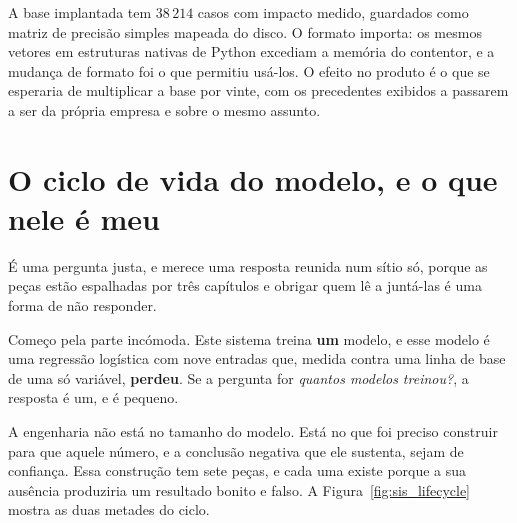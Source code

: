 A base implantada tem $38\,214$ casos com impacto medido, guardados como matriz de precisão
simples mapeada do disco. O formato importa: os mesmos vetores em estruturas nativas de Python
excediam a memória do contentor, e a mudança de formato foi o que permitiu usá-los. O efeito no
produto é o que se esperaria de multiplicar a base por vinte, com os precedentes exibidos a passarem
a ser da própria empresa e sobre o mesmo assunto.

\section{O ciclo de vida do modelo, e o que nele é meu}
\label{sec:sis_ciclo_vida}

É uma pergunta justa, e merece uma resposta reunida num sítio só, porque as peças estão espalhadas
por três capítulos e obrigar quem lê a juntá-las é uma forma de não responder.

Começo pela parte incómoda. Este sistema treina \textbf{um} modelo, e esse modelo é uma regressão
logística com nove entradas que, medida contra uma linha de base de uma só variável,
\textbf{perdeu}. Se a pergunta for \emph{quantos modelos treinou?}, a resposta é um, e é pequeno.

A engenharia não está no tamanho do modelo. Está no que foi preciso construir para que aquele
número, e a conclusão negativa que ele sustenta, sejam de confiança. Essa construção tem sete peças,
e cada uma existe porque a sua ausência produziria um resultado bonito e falso.
A Figura~\ref{fig:sis_lifecycle} mostra as duas metades do ciclo.

